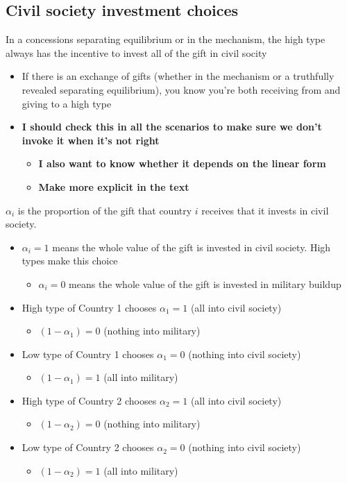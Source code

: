 \documentclass[12pt]{article}
\newcommand{\al}{\alpha}
\begin{document}
\subsection{Civil society investment choices}
\label{sec:civ}
In a concessions separating equilibrium or in the mechanism, the high type always has the incentive to invest all of the gift in civil socity
	\begin{itemize}
		\item If there is an exchange of gifts (whether in the mechanism or a truthfully revealed separating equilibrium), you know you're both receiving from and giving to a high type
		\item \textbf{I should check this in all the scenarios to make sure we don't invoke it when it's not right}
			\begin{itemize}
				\item \textbf{I also want to know whether it depends on the linear form}
				\item \textbf{Make more explicit in the text}
			\end{itemize}
	\end{itemize}
$\al_i$ is the proportion of the gift that country $i$ receives that it invests in civil society.
	\begin{itemize}
		\item $\al_i = 1$ means the whole value of the gift is invested in civil society. High types make this choice
			\begin{itemize}
				\item $\al_i = 0$ means the whole value of the gift is invested in military buildup
			\end{itemize}
			
		\item High type of Country 1 chooses $\al_1=1$ (all into civil society) 
			\begin{itemize}
				\item $(1-\al_1) = 0$ (nothing into military)
			\end{itemize}
		\item Low type of Country 1 chooses $\al_1=0$ (nothing into civil society) 
			\begin{itemize}
				\item $(1-\al_1) = 1$ (all into military)
			\end{itemize}
		\item High type of Country 2 chooses $\al_2=1$ (all into civil society) 
			\begin{itemize}
				\item $(1-\al_2) = 0$ (nothing into military)
			\end{itemize}
		\item Low type of Country 2 chooses $\al_2=0$ (nothing into civil society) 
			\begin{itemize}
				\item $(1-\al_2) = 1$ (all into military)
			\end{itemize}	
	\end{itemize}
\end{document}
